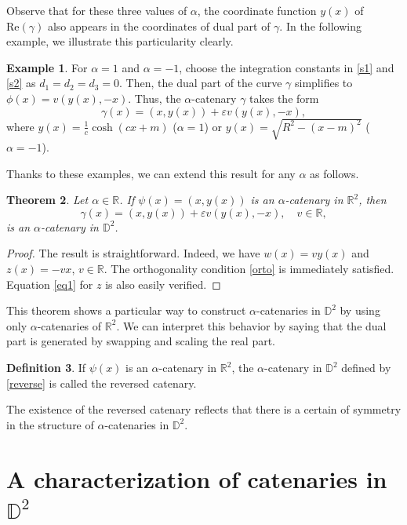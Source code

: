 \documentclass[a4paper,12pt]{amsart}
\newtheorem{theorem}{Theorem}[section]
\theoremstyle{definition}
\newtheorem{definition}[theorem]{Definition}
\newtheorem{example}[theorem]{Example}
\def\r{\mathbb R}
\def\d{\mathsf d}
\def\d{\mathbb D}
\begin{document}
Observe that for these three values of $\alpha$, the coordinate function $y(x)$ of $\mbox{Re}(\gamma)$ also appears in the coordinates of dual part of $\gamma$. In the following example, we illustrate this particularity clearly.

\begin{example} For $\alpha=1$ and $\alpha=-1$,  choose   the integration constants in \eqref{s1} and \eqref{s2} as $d_1=d_2=d_3=0$. Then,  the dual part of the curve $\gamma$ simplifies   to $\phi(x) =  v(y(x), -x)$.  Thus, the $\alpha$-catenary $\gamma$ takes the   form
$$\gamma(x) = (x, y(x)) + \varepsilon v (y(x), -x),$$
where $y(x) = \frac{1}{c}\cosh(cx+m)$ ($\alpha=1$) or $y(x) = \sqrt{R^2-(x-m)^2}$ ($\alpha=-1$). 
\end{example}

Thanks to these examples, we can extend this result for any $\alpha$ as follows.

\begin{theorem} \label{t27}
Let $\alpha\in\r$. If $\psi(x) = (x, y(x))$ is an $\alpha$-catenary in $\r^2$, then 
\begin{equation}\label{reverse}
\gamma(x) = (x, y(x)) + \varepsilon v (y(x), -x), \quad v\in \r,
\end{equation}
is an $\alpha$-catenary in $\d^2$. 
\end{theorem}

 \begin{proof}
 The result is straightforward. Indeed, we have $w(x)=v y(x)$ and $z(x)=-vx$, $v\in \r$. The orthogonality condition \eqref{orto} is immediately satisfied. Equation \eqref{eq1} for $z$ is also easily verified. 
  

 \end{proof}

This theorem shows a particular way to construct $\alpha$-catenaries in $\d^2$ by using only $\alpha$-catenaries of $\r^2$. 
We can interpret this behavior by saying that the dual part is generated by swapping and scaling the real part. 

\begin{definition} If $\psi(x)$ is an $\alpha$-catenary in $\r^2$,   the $\alpha$-catenary in $\d^2$ defined by \eqref{reverse} is called the reversed catenary.
\end{definition}
The existence of the reversed catenary reflects that there is a certain of symmetry in  the structure of $\alpha$-catenaries in $\d^2$. 


\section{A characterization of catenaries in $\d^2$} \label{sec3}
\end{document}
